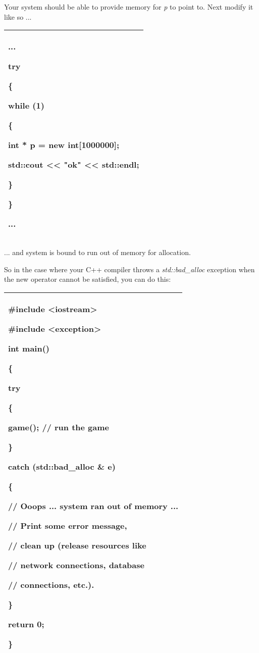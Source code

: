 \documentclass[
]{article}
\begin{document}
Your system should be able to provide memory for \emph{p} to point to.
Next modify it like so ...

\begin{longtable}[]{@{}l@{}}
\toprule
\endhead
\begin{minipage}[t]{0.97\columnwidth}\raggedright
...

try

\{

while (1)

\{

int * p = new int{[}1000000{]};

std::cout \textless\textless{} "ok" \textless\textless{} std::endl;

\}

\}

...\strut
\end{minipage}\tabularnewline
\bottomrule
\end{longtable}

... and system is bound to run out of memory for allocation.

So in the case where your C++ compiler throws a \emph{std::bad\_alloc}
exception when the new operator cannot be satisfied, you can do this:

\begin{longtable}[]{@{}l@{}}
\toprule
\endhead
\begin{minipage}[t]{0.97\columnwidth}\raggedright
\#include \textless iostream\textgreater{}

\#include \textless exception\textgreater{}

int main()

\{

try

\{

game(); // run the game

\}

catch (\textbf{std::bad\_alloc} \& e)

\{

// Ooops ... system ran out of memory ...

// Print some error message,

// clean up (release resources like

// network connections, database

// connections, etc.).

\}

return 0;

\}\strut
\end{minipage}\tabularnewline
\bottomrule
\end{longtable}
\end{document}
